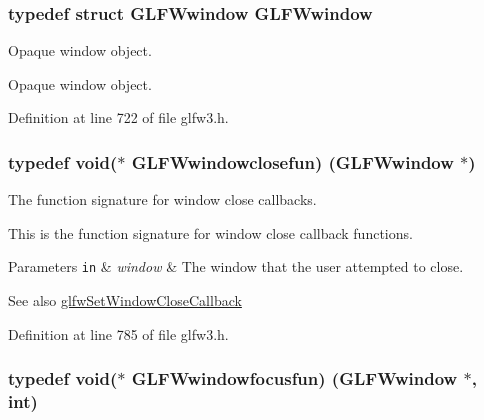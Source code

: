 \subsubsection[{G\+L\+F\+Wwindow}]{\setlength{\rightskip}{0pt plus 5cm}typedef struct {\bf G\+L\+F\+Wwindow} {\bf G\+L\+F\+Wwindow}}\label{group__window_ga3c96d80d363e67d13a41b5d1821f3242}


Opaque window object. 

Opaque window object. 

Definition at line 722 of file glfw3.\+h.

\hypertarget{group__window_ga93e7c2555bd837f4ed8b20f76cada72e}{}
\subsubsection[{G\+L\+F\+Wwindowclosefun}]{\setlength{\rightskip}{0pt plus 5cm}typedef {\bf void}($\ast$  G\+L\+F\+Wwindowclosefun) ({\bf G\+L\+F\+Wwindow} $\ast$)}\label{group__window_ga93e7c2555bd837f4ed8b20f76cada72e}


The function signature for window close callbacks. 

This is the function signature for window close callback functions.


\begin{DoxyParams}[1]{Parameters}
\mbox{\tt in}  & {\em window} & The window that the user attempted to close.\\
\hline
\end{DoxyParams}
\begin{DoxySeeAlso}{See also}
\hyperlink{group__window_ga5b827da350141c789acd64f5c4f7a0e1}{glfw\+Set\+Window\+Close\+Callback} 
\end{DoxySeeAlso}


Definition at line 785 of file glfw3.\+h.

\hypertarget{group__window_ga58be2061828dd35080bb438405d3a7e2}{}
\subsubsection[{G\+L\+F\+Wwindowfocusfun}]{\setlength{\rightskip}{0pt plus 5cm}typedef {\bf void}($\ast$  G\+L\+F\+Wwindowfocusfun) ({\bf G\+L\+F\+Wwindow} $\ast$, {\bf int})}\label{group__window_ga58be2061828dd35080bb438405d3a7e2}


